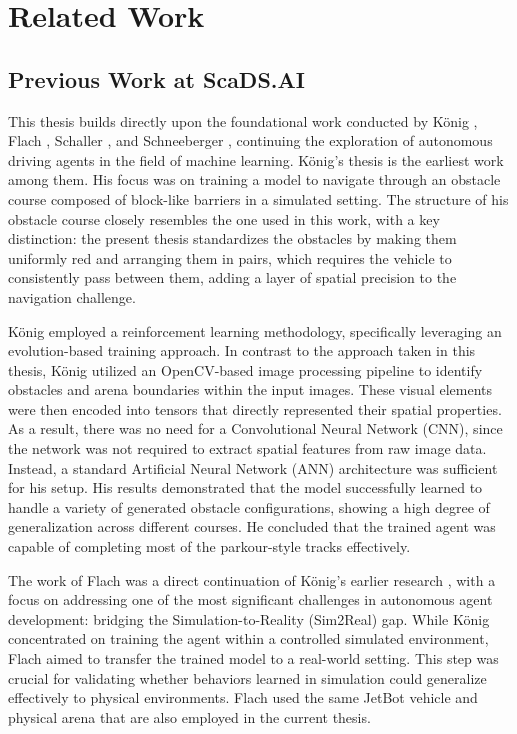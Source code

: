 \chapter{Related Work}
\label{cha:RelatedWork}

\section{Previous Work at ScaDS.AI}

This thesis builds directly upon the foundational work conducted by König \autocite{konig2022model}, Flach \autocite{flach2023methods}, Schaller \autocite{schaller2023train}, and Schneeberger \autocite{schneeberger2024end}, continuing the exploration of autonomous driving agents in the field of machine learning. König's thesis is the earliest work among them. His focus was on training a model to navigate through an obstacle course composed of block-like barriers in a simulated setting. The structure of his obstacle course closely resembles the one used in this work, with a key distinction: the present thesis standardizes the obstacles by making them uniformly red and arranging them in pairs, which requires the vehicle to consistently pass between them, adding a layer of spatial precision to the navigation challenge.

König \autocite{konig2022model} employed a reinforcement learning methodology, specifically leveraging an evolution-based training approach. In contrast to the approach taken in this thesis, König \autocite{konig2022model} utilized an OpenCV-based image processing pipeline to identify obstacles and arena boundaries within the input images. These visual elements were then encoded into tensors that directly represented their spatial properties. As a result, there was no need for a Convolutional Neural Network (CNN), since the network was not required to extract spatial features from raw image data. Instead, a standard Artificial Neural Network (ANN) architecture was sufficient for his setup. His results demonstrated that the model successfully learned to handle a variety of generated obstacle configurations, showing a high degree of generalization across different courses. He concluded that the trained agent was capable of completing most of the parkour-style tracks effectively.

The work of Flach \autocite{flach2023methods} was a direct continuation of König’s earlier research \autocite{konig2022model}, with a focus on addressing one of the most significant challenges in autonomous agent development: bridging the Simulation-to-Reality (Sim2Real) gap. While König concentrated on training the agent within a controlled simulated environment, Flach aimed to transfer the trained model to a real-world setting. This step was crucial for validating whether behaviors learned in simulation could generalize effectively to physical environments. Flach \autocite{flach2023methods} used the same JetBot vehicle and physical arena that are also employed in the current thesis.

